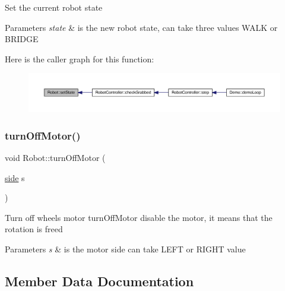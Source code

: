 Set the current robot state 
\begin{DoxyParams}{Parameters}
{\em state} & is the new robot state, can take three values W\+A\+LK or B\+R\+I\+D\+GE \\
\hline
\end{DoxyParams}
Here is the caller graph for this function\+:\nopagebreak
\begin{figure}[H]
\begin{center}
\leavevmode
\includegraphics[width=350pt]{class_robot_aaf534f168d818112ae1f6440b329eb0a_icgraph}
\end{center}
\end{figure}
\mbox{\label{class_robot_a4d3a07ab64d0a9289a20d40e9a9f27dc}} 
\subsubsection{\texorpdfstring{turn\+Off\+Motor()}{turnOffMotor()}}
{\footnotesize\ttfamily void Robot\+::turn\+Off\+Motor (\begin{DoxyParamCaption}\item[{\mbox{\hyperlink{_robot_8h_afc015eff6557e84151d2e53b94375445}{side}}}]{s }\end{DoxyParamCaption})}

Turn off wheels\textquotesingle{} motor turn\+Off\+Motor disable the motor, it means that the rotation is freed 
\begin{DoxyParams}{Parameters}
{\em s} & is the motor side can take L\+E\+FT or R\+I\+G\+HT value \\
\hline
\end{DoxyParams}


\subsection{Member Data Documentation}
\mbox{\label{class_robot_a35d0d222246bd7084fac5ae5cdf6d3ce}} 
